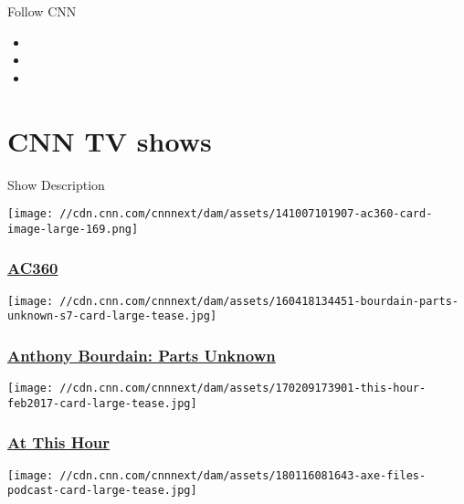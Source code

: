 Follow CNN

\begin{itemize}
\item
\item
\item
\end{itemize}

\hypertarget{cnn-tv-shows}{%
\section{CNN TV shows}\label{cnn-tv-shows}}

Show Description

\href{/shows/ac-360}{}

\texttt{[image: //cdn.cnn.com/cnnnext/dam/assets/141007101907-ac360-card-image-large-169.png]}

\hypertarget{ac360}{%
\subsubsection{\texorpdfstring{\href{/shows/ac-360}{AC360}}{AC360}}\label{ac360}}

\href{/shows/anthony-bourdain-parts-unknown}{}

\texttt{[image: //cdn.cnn.com/cnnnext/dam/assets/160418134451-bourdain-parts-unknown-s7-card-large-tease.jpg]}

\hypertarget{anthony-bourdain-parts-unknown}{%
\subsubsection{\texorpdfstring{\href{/shows/anthony-bourdain-parts-unknown}{Anthony
Bourdain: Parts
Unknown}}{Anthony Bourdain: Parts Unknown}}\label{anthony-bourdain-parts-unknown}}

\href{/shows/at-this-hour}{}

\texttt{[image: //cdn.cnn.com/cnnnext/dam/assets/170209173901-this-hour-feb2017-card-large-tease.jpg]}

\hypertarget{at-this-hour}{%
\subsubsection{\texorpdfstring{\href{/shows/at-this-hour}{At This
Hour}}{At This Hour}}\label{at-this-hour}}

\href{/specials/politics/axe-files}{}

\texttt{[image: //cdn.cnn.com/cnnnext/dam/assets/180116081643-axe-files-podcast-card-large-tease.jpg]}


